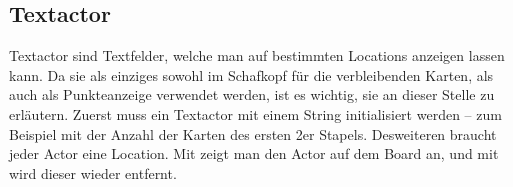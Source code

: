 \subsection{Textactor}

Textactor sind Textfelder, welche man auf bestimmten Locations anzeigen lassen
kann. Da sie als einziges sowohl im Schafkopf für die verbleibenden Karten, als
auch als Punkteanzeige verwendet werden, ist es wichtig, sie an dieser Stelle
zu erläutern. Zuerst muss ein Textactor mit einem String initialisiert werden
-- zum Beispiel mit der Anzahl der Karten des ersten 2er Stapels. Desweiteren
braucht jeder Actor eine Location. Mit 
zeigt man den Actor auf dem Board an, und mit 
wird dieser wieder entfernt.
